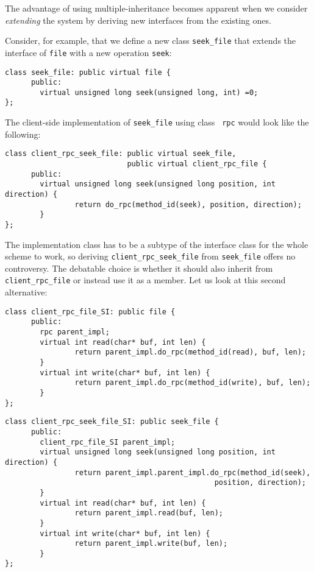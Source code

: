 The advantage of using multiple-inheritance becomes apparent when we
consider {\em extending} the system by deriving new interfaces from
the existing ones. 

Consider, for example, that we define a new class {\tt seek\_file} that
extends the interface of {\tt file} with a new operation {\tt seek}:

{\small 
\begin{verbatim}
class seek_file: public virtual file {
      public:
        virtual unsigned long seek(unsigned long, int) =0;
};
\end{verbatim}
}

\noindent
The client-side implementation of {\tt seek\_file} using class {\tt
rpc} would look like the following:

{\small 
\begin{verbatim}
class client_rpc_seek_file: public virtual seek_file,
                            public virtual client_rpc_file {
      public:
        virtual unsigned long seek(unsigned long position, int direction) {
                return do_rpc(method_id(seek), position, direction);
        }
};
\end{verbatim}
}

The implementation class has to be a subtype of the interface class
for the whole scheme to work, so deriving 
{\tt client\_rpc\_seek\_file} from {\tt seek\_file} offers no
controversy. The debatable choice is whether it should also inherit
from {\tt client\_rpc\_file} or instead use it as a member. Let us
look at this second alternative: 

{\small 
\begin{verbatim}
class client_rpc_file_SI: public file {
      public:
        rpc parent_impl;
        virtual int read(char* buf, int len) { 
                return parent_impl.do_rpc(method_id(read), buf, len);
        }
        virtual int write(char* buf, int len) {
                return parent_impl.do_rpc(method_id(write), buf, len);
        }
};
\end{verbatim}
}
{\small 
\begin{verbatim}
class client_rpc_seek_file_SI: public seek_file {
      public:
        client_rpc_file_SI parent_impl;
        virtual unsigned long seek(unsigned long position, int direction) {
                return parent_impl.parent_impl.do_rpc(method_id(seek),
                                                position, direction);
        }
        virtual int read(char* buf, int len) { 
                return parent_impl.read(buf, len);
        }
        virtual int write(char* buf, int len) {
                return parent_impl.write(buf, len);
        }
};
\end{verbatim}
}

